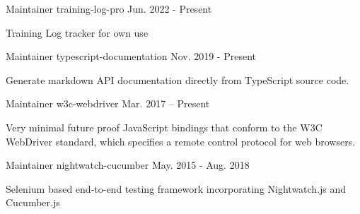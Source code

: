 

\begin{cventries}

  \cventry
    {Maintainer} %
    {training-log-pro} %
    {} %
    {Jun. 2022 - Present} %
    {
      \begin{cvitems} %
        \item {Training Log tracker for own use}
      \end{cvitems}
    }

  \cventry
    {Maintainer} %
    {typescript-documentation} %
    {} %
    {Nov. 2019 - Present} %
    {
      \begin{cvitems} %
        \item {Generate markdown API documentation directly from TypeScript source code.}
      \end{cvitems}
    }

  \cventry
    {Maintainer} %
    {w3c-webdriver} %
    {} %
    {Mar. 2017 – Present} %
    {
      \begin{cvitems} %
        \item {Very minimal future proof JavaScript bindings that conform to the W3C WebDriver standard, which specifies a remote control protocol for web browsers.}
      \end{cvitems}
    }

  \cventry
    {Maintainer} %
    {nightwatch-cucumber} %
    {} %
    {May. 2015 - Aug. 2018} %
    {
      \begin{cvitems} %
        \item {Selenium based end-to-end testing framework incorporating Nightwatch.js and Cucumber.js}
      \end{cvitems}
    }

\end{cventries}
